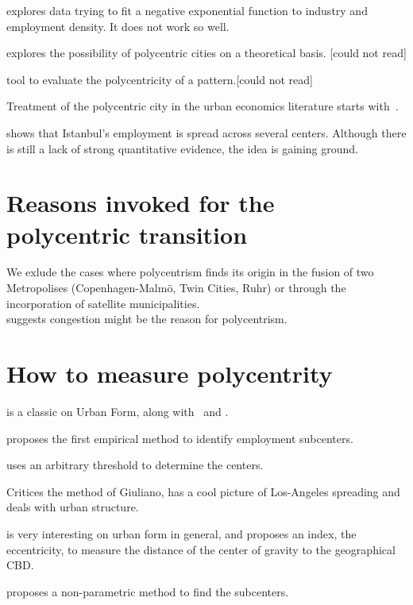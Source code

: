 \cite{Kemper:1974} explores data trying to fit a negative exponential function
to industry and employment density. It does not work so well.

\cite{Odland:1978} explores the possibility of polycentric cities on a
theoretical basis. [could not read]

\cite{Griffith:1981} tool to evaluate the polycentricity of a pattern.[could not
read]

Treatment of the polycentric city in the urban economics literature starts
with~\cite{Fujita:1982}.

\cite{Dokmeci:1994} shows that Istanbul's employment is spread across several
centers. Although there is still a lack of strong quantitative evidence, the
idea is gaining ground.

\section{Reasons invoked for the polycentric transition}
\label{sec:reasons_invoked_for_the_polycentric_transition}

We exlude the cases where polycentrism finds its origin in the fusion of two
Metropolises (Copenhagen-Malm\"o, Twin Cities, Ruhr) or through the
incorporation of satellite municipalities.\\

\cite{McMillen:2003} suggests congestion might be the reason for polycentrism.

\section{How to measure polycentrity}
\label{sec:how_to_measure_polycentrity}

\cite{Tsai:2005} is a classic on Urban Form, along with~\cite{LeNechet:2015} and
\cite{Schwarz:2010}.

\cite{McDonald:1987} proposes the first empirical method to identify employment
subcenters.

\cite{Giuliano:1991} uses an arbitrary threshold to determine the centers.

\cite{Anas:1998} Critices the method of Giuliano, has a cool picture of
Los-Angeles spreading and deals with urban structure.

\cite{Bertaud:2001} is very interesting on urban form in general, and proposes
an index, the eccentricity, to measure the distance of the center of gravity to
the geographical CBD.


\cite{McMillen:2001} proposes a non-parametric method to find the subcenters.

